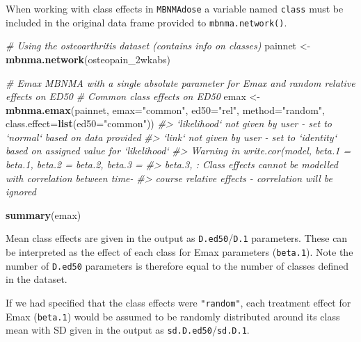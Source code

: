 \documentclass[]{article}
\newenvironment{Shaded}{\begin{snugshade}}{\end{snugshade}}
\newcommand{\CommentTok}[1]{\textcolor[rgb]{0.56,0.35,0.01}{\textit{#1}}}
\newcommand{\DataTypeTok}[1]{\textcolor[rgb]{0.13,0.29,0.53}{#1}}
\newcommand{\KeywordTok}[1]{\textcolor[rgb]{0.13,0.29,0.53}{\textbf{#1}}}
\newcommand{\NormalTok}[1]{#1}
\newcommand{\StringTok}[1]{\textcolor[rgb]{0.31,0.60,0.02}{#1}}
\begin{document}
When working with class effects in \texttt{MBNMAdose} a variable named
\texttt{class} must be included in the original data frame provided to
\texttt{mbnma.network()}.

\begin{Shaded}
\begin{Highlighting}[]
\CommentTok{# Using the osteoarthritis dataset (contains info on classes)}
\NormalTok{painnet <-}\StringTok{ }\KeywordTok{mbnma.network}\NormalTok{(osteopain_2wkabs)}
\end{Highlighting}
\end{Shaded}

\begin{Shaded}
\begin{Highlighting}[]
\CommentTok{# Emax MBNMA with a single absolute parameter for Emax and random relative effects on ED50}
\CommentTok{# Common class effects on ED50}
\NormalTok{emax <-}\StringTok{ }\KeywordTok{mbnma.emax}\NormalTok{(painnet, }\DataTypeTok{emax=}\StringTok{"common"}\NormalTok{, }\DataTypeTok{ed50=}\StringTok{"rel"}\NormalTok{, }\DataTypeTok{method=}\StringTok{"random"}\NormalTok{,}
                   \DataTypeTok{class.effect=}\KeywordTok{list}\NormalTok{(}\DataTypeTok{ed50=}\StringTok{"common"}\NormalTok{))}
\CommentTok{#> `likelihood` not given by user - set to `normal` based on data provided}
\CommentTok{#> `link` not given by user - set to `identity` based on assigned value for `likelihood`}
\CommentTok{#> Warning in write.cor(model, beta.1 = beta.1, beta.2 = beta.2, beta.3 =}
\CommentTok{#> beta.3, : Class effects cannot be modelled with correlation between time-}
\CommentTok{#> course relative effects - correlation will be ignored}
\end{Highlighting}
\end{Shaded}

\begin{Shaded}
\begin{Highlighting}[]
\KeywordTok{summary}\NormalTok{(emax)}
\end{Highlighting}
\end{Shaded}

Mean class effects are given in the output as
\texttt{D.ed50}/\texttt{D.1} parameters. These can be interpreted as the
effect of each class for Emax parameters (\texttt{beta.1}). Note the
number of \texttt{D.ed50} parameters is therefore equal to the number of
classes defined in the dataset.

If we had specified that the class effects were \texttt{"random"}, each
treatment effect for Emax (\texttt{beta.1}) would be assumed to be
randomly distributed around its class mean with SD given in the output
as \texttt{sd.D.ed50}/\texttt{sd.D.1}.
\end{document}
